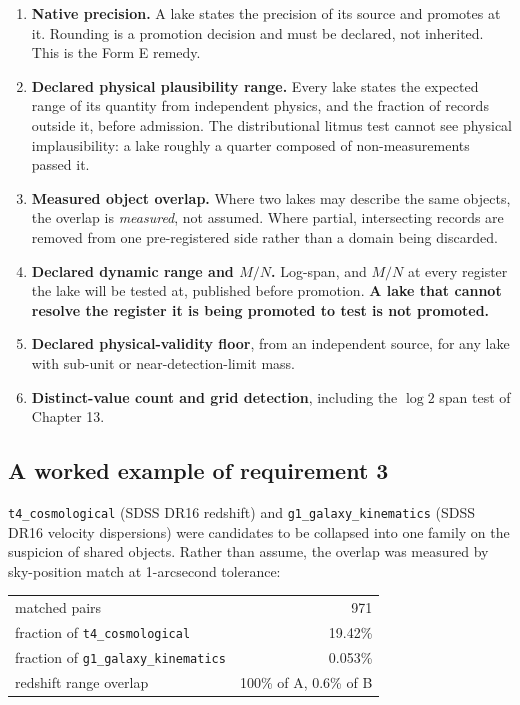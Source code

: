 \documentclass[11pt, letterpaper, openany]{book}
\begin{document}
\begin{enumerate}
    \item \textbf{Native precision.} A lake states the precision of its source and promotes at
          it. Rounding is a promotion decision and must be declared, not inherited. This is the
          Form E remedy.
    \item \textbf{Declared physical plausibility range.} Every lake states the expected range of
          its quantity from independent physics, and the fraction of records outside it, before
          admission. The distributional litmus test cannot see physical implausibility: a lake
          roughly a quarter composed of non-measurements passed it.
    \item \textbf{Measured object overlap.} Where two lakes may describe the same objects, the
          overlap is \emph{measured}, not assumed. Where partial, intersecting records are removed
          from one pre-registered side rather than a domain being discarded.
    \item \textbf{Declared dynamic range and $M/N$.} Log-span, and $M/N$ at every register the
          lake will be tested at, published before promotion. \textbf{A lake that cannot resolve
          the register it is being promoted to test is not promoted.}
    \item \textbf{Declared physical-validity floor}, from an independent source, for any lake
          with sub-unit or near-detection-limit mass.
    \item \textbf{Distinct-value count and grid detection}, including the $\log 2$ span test of
          Chapter 13.
\end{enumerate}

\subsection{A worked example of requirement 3}

\texttt{t4\_cosmological} (SDSS DR16 redshift) and \texttt{g1\_galaxy\_kinematics} (SDSS DR16
velocity dispersions) were candidates to be collapsed into one family on the suspicion of shared
objects. Rather than assume, the overlap was measured by sky-position match at
1-arcsecond tolerance:

\begin{table}[H]
\centering
\small
\begin{tabular}{@{}lr@{}}
\toprule
matched pairs & 971 \\
fraction of \texttt{t4\_cosmological} & 19.42\% \\
fraction of \texttt{g1\_galaxy\_kinematics} & 0.053\% \\
redshift range overlap & 100\% of A, 0.6\% of B \\
\bottomrule
\end{tabular}
\end{table}
\end{document}
